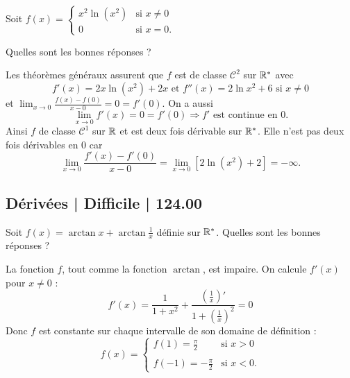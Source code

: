 \begin{question}
Soit $f(x)=\left\{\begin{array}{ll}x^2\ln (x^2)&\mbox{si }x\neq 0\\ 0&\mbox{si }x=0.\end{array} \right.$

Quelles sont les bonnes réponses ?
\begin{answers}  
\end{answers}
\begin{explanations}
Les théorèmes généraux assurent que $f$ est de classe $\mathscr{C}^2$ sur $\mathbb{R}^*$ avec
$$f'(x)=2x\ln (x^2)+2x\mbox{ et }f''(x)=2\ln x^2+6\mbox{ si }x\neq 0$$
et $\displaystyle \lim _{x\to 0}\frac{f(x)-f(0)}{x-0}=0=f'(0)$. On a aussi
$$\lim _{x\to 0}f'(x)=0=f'(0) \Rightarrow f'\mbox{ est continue en }0.$$
Ainsi $f$ de classe $\mathscr{C}^1$ sur $\mathbb{R}$ et est deux fois dérivable sur $\mathbb{R}^*$. Elle n'est pas deux fois dérivables en $0$ car
$$\lim _{x\to 0}\frac{f'(x)-f'(0)}{x-0}=\lim _{x\to 0}[2\ln (x^2)+2]=-\infty.$$
\end{explanations}
\end{question}



\subsection{Dérivées | Difficile | 124.00}



\begin{question}
Soit $f(x)=\arctan x+\arctan \frac{1}{x}$ définie sur $\mathbb{R}^*$. Quelles sont les bonnes réponses ?
\begin{answers}  
\end{answers}
\begin{explanations}
La fonction $f$, tout comme la fonction $\arctan$, est impaire. On calcule $f'(x)$ pour $x\neq 0$ : 
$$f'(x)=\frac{1}{1+x^2}+\frac{\left(\frac{1}{x}\right)'}{1+\left(\frac{1}{x}\right)^2}=0$$
Donc $f$ est constante sur chaque intervalle de son domaine de définition :
$$f(x)=\left\{\begin{array}{ll}\displaystyle f(1)=\frac{\pi}{2}&\mbox{si }x>0\\ \\ f(-1)=-\frac{\pi}{2}&\mbox{si }x<0.\end{array}
\right.$$
\end{explanations}
\end{question}


